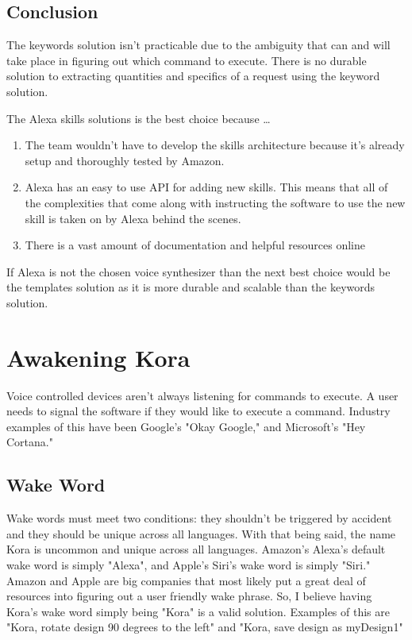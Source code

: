 \documentclass[onecolumn, draftclsnofoot,10pt, compsoc]{IEEEtran}
\begin{document}
	
		\subsection{Conclusion}
			The keywords solution isn't practicable due to the ambiguity that can and will take place in figuring out which command to execute.
			There is no durable solution to extracting quantities and specifics of a request using the keyword solution.
			
			The Alexa skills solutions is the best choice because \dots
			\begin{enumerate}
				\item{
					The team wouldn't have to develop the skills architecture because it's already setup and thoroughly tested by Amazon.}
				\item{
					Alexa has an easy to use API for adding new skills.
					This means that all of the complexities that come along with instructing the software to use the new skill is taken on by Alexa behind the scenes.}
				\item{
					There is a vast amount of documentation and helpful resources online}
			\end{enumerate}
			
			If Alexa is not the chosen voice synthesizer than the next best choice would be the templates solution as it is more durable and scalable than the keywords solution.

	
	\section{Awakening Kora}
		Voice controlled devices aren't always listening for commands to execute.
		A user needs to signal the software if they would like to execute a command.
		Industry examples of this have been Google's "Okay Google," and Microsoft's "Hey Cortana."
		
		\subsection{Wake Word}
			Wake words must meet two conditions: they shouldn't be triggered by accident and they should be unique across all languages.
			With that being said, the name Kora is uncommon and unique across all languages.
			Amazon's Alexa's default wake word is simply "Alexa", and Apple's Siri's wake word is simply "Siri."
			Amazon and Apple are big companies that most likely put a great deal of resources into figuring out a user friendly wake phrase.
			So, I believe having Kora's wake word simply being "Kora" is a valid solution.
			Examples of this are "Kora, rotate design 90 degrees to the left" and "Kora, save design as myDesign1"
		
\end{document}
